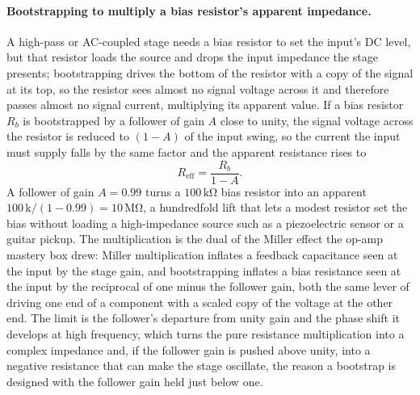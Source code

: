 \paragraph{Bootstrapping to multiply a bias resistor's apparent impedance.}
A high-pass or AC-coupled stage needs a bias resistor to set the input's DC
level, but that resistor loads the source and drops the input impedance the stage
presents; bootstrapping drives the bottom of the resistor with a copy of the
signal at its top, so the resistor sees almost no signal voltage across it and
therefore passes almost no signal current, multiplying its apparent value. If a
bias resistor $R_b$ is bootstrapped by a follower of gain $A$ close to unity, the
signal voltage across the resistor is reduced to $(1 - A)$ of the input swing, so
the current the input must supply falls by the same factor and the apparent
resistance rises to
\[
R_{\text{eff}} = \frac{R_b}{1 - A}.
\]
A follower of gain $A = 0.99$ turns a $100\,\si{\kilo\ohm}$ bias resistor into an
apparent $100\,\text{k}/(1 - 0.99) = 10\,\si{\mega\ohm}$, a hundredfold lift that
lets a modest resistor set the bias without loading a high-impedance source such
as a piezoelectric sensor or a guitar pickup. The multiplication is the dual of
the Miller effect the op-amp mastery box drew: Miller multiplication inflates a
feedback capacitance seen at the input by the stage gain, and bootstrapping
inflates a bias resistance seen at the input by the reciprocal of one minus the
follower gain, both the same lever of driving one end of a component with a
scaled copy of the voltage at the other end. The limit is the follower's
departure from unity gain and the phase shift it develops at high frequency,
which turns the pure resistance multiplication into a complex impedance and, if
the follower gain is pushed above unity, into a negative resistance that can make
the stage oscillate, the reason a bootstrap is designed with the follower gain
held just below one.








